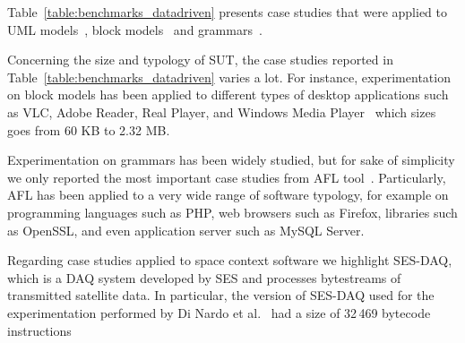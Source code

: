 Table~\ref{table:benchmarks_datadriven} presents case studies that were applied to UML models~\cite{di2017augmenting}, block models~\cite{pham2016model} and grammars~\cite{AFL:industrialcases}.

Concerning the size and typology of SUT, the case studies reported in Table~\ref{table:benchmarks_datadriven} varies a lot.
For instance, experimentation on block models has been applied to different types of desktop applications such as VLC, Adobe Reader, Real Player, and Windows Media Player~\cite{pham2016model} which sizes goes from 60 KB to 2.32 MB. 

Experimentation on grammars has been widely studied, but for sake of simplicity we only reported the most important case studies from AFL tool~\cite{AFL:industrialcases}. Particularly, AFL has been applied to a very wide range of software typology, for example on programming languages such as PHP, web browsers such as Firefox, libraries such as OpenSSL, and even application server such as MySQL Server. 

Regarding case studies applied to space context software we highlight SES-DAQ, which is a DAQ system developed by SES and processes bytestreams of transmitted satellite data. In particular, the version of SES-DAQ used for the experimentation performed by Di Nardo et al.~\cite{di2017augmenting} had a size of 32\,469 bytecode instructions




